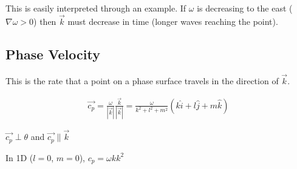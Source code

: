 \documentclass[a4paper,12pt]{article}
\begin{document}
This is easily interpreted through an example. If $\omega$ is decreasing to the east ($\nabla \omega > 0$) then $\vec{k}$ must decrease in time (longer waves reaching the point).

\subsection*{Phase Velocity}
This is the rate that a point on a phase surface travels in the direction of $\vec{k}$.

\begin{align*}
\vec{c_p} = \frac{\omega}{|\vec{k}|}\frac{\vec{k}}{|\vec{k}|} = \frac{\omega}{k^2 + l^2 + m^2}(k\hat{i} + l\hat{j} + m\hat{k})
\end{align*}

$\vec{c_p} \perp \theta$ and $\vec{c_p} \parallel \vec{k}$

In 1D ($l = 0$, $m=0$), $c_p = {\omega k}{k^2}$
\end{document}
